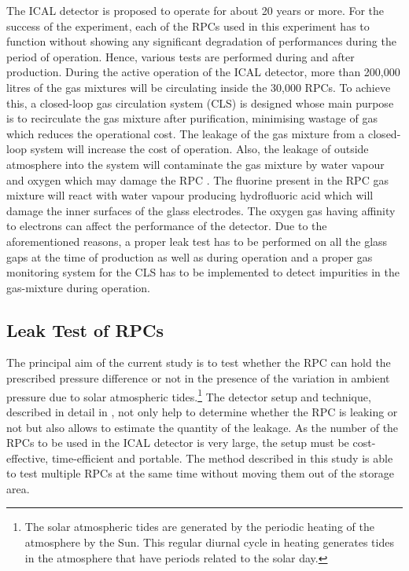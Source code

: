 The ICAL detector is proposed to operate for about 20 years or more.
For the success of the experiment, each of the RPCs used in this
experiment has to function without showing any significant degradation
of performances during the period of operation. Hence, various tests
are performed during and after production. During the active operation
of the ICAL detector, more than 200,000\,litres of the gas mixtures
will be circulating inside the 30,000 RPCs. To achieve this, a
closed-loop gas circulation system (CLS) is designed whose main
purpose is to recirculate the gas mixture after purification,
minimising wastage of gas which reduces the operational cost. The
leakage of the gas mixture from a closed-loop system will increase the
cost of operation. Also, the leakage of outside atmosphere into the
system will contaminate the gas mixture by water vapour and oxygen
which may damage the RPC \cite{rpc_c,rpc_w}. The fluorine present in
the RPC gas mixture will react with water vapour producing
hydrofluoric acid which will damage the inner surfaces of the glass
electrodes. The oxygen gas having affinity to electrons can affect the
performance of the detector. Due to the aforementioned reasons, a
proper leak test has to be performed on all the glass gaps at the time
of production as well as during operation and a proper gas monitoring
system for the CLS has to be implemented to detect impurities in the
gas-mixture during operation.

\subsection*{Leak Test of RPCs}
The principal aim of the current study is to test whether the RPC can
hold the prescribed pressure difference or not in the presence of the
variation in ambient pressure due to solar atmospheric tides.\footnote{The solar atmospheric tides are generated by the periodic heating of the atmosphere by the Sun. This regular diurnal cycle in heating generates tides in the atmosphere that have periods related to the solar day.}
The detector setup and technique, described in detail in
\cite{rpcleak}, not only help to determine whether the RPC is leaking
or not but also allows to estimate the quantity of the leakage. As the
number of the RPCs to be used in the ICAL detector is very large, the
setup must be cost-effective, time-efficient and portable. The method
described in this study is able to test multiple RPCs at the same time
without moving them out of the storage area.

